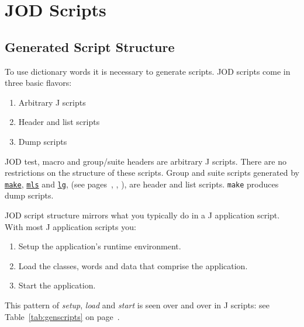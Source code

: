 
\section{JOD Scripts}

\subsection{Generated Script Structure}\label{ss:genscripts}

To use dictionary words it is necessary to generate scripts.  JOD scripts come in three basic flavors:
\begin{enumerate}
	\item Arbitrary J scripts 
  \item Header and list scripts
  \item Dump scripts
\end{enumerate}

JOD test, macro and group/suite headers are arbitrary J scripts.  There are no restrictions on the structure of these scripts.  Group and suite scripts generated by 
\hyperlink{il:make}{\texttt{make}}, \hyperlink{il:mls}{\texttt{mls}} and 
\hyperlink{il:lg}{\texttt{lg}}, (see pages~\pageref{ss:make}, \pageref{ss:mls},
\pageref{ss:lg}), are header and list scripts.  \texttt{make} produces dump scripts.  

JOD script structure mirrors what you typically do in a J application script.  With most J application scripts you: 
\begin{enumerate}
	\item Setup the application's runtime environment.
	\item Load the classes, words and data that comprise the application.
	\item Start the application.
\end{enumerate}

This pattern of \emph{setup}, \emph{load} and \emph{start} is seen over and over in J scripts: see  
Table~\ref{tab:genscripts} on page~\pageref{tab:genscripts}.

